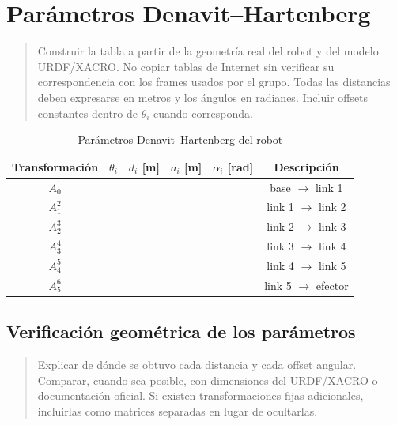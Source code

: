 \documentclass[journal]{IEEEtran}
\newcommand{\instr}[1]{%
\begin{quote}
\small
\noindent\textbf{\color{blue}{INSTRUCCIÓN:}} #1
\end{quote}
}
\newcommand{\pendiente}[1]{\textbf{\color{red}{[#1]}}}
\begin{document}
\section{Parámetros Denavit--Hartenberg}

\instr{Construir la tabla a partir de la geometría real del robot y del modelo URDF/XACRO. No copiar tablas de Internet sin verificar su correspondencia con los frames usados por el grupo. Todas las distancias deben expresarse en metros y los ángulos en radianes. Incluir offsets constantes dentro de $\theta_i$ cuando corresponda.}

\begin{table}[t]
\centering
\caption{Parámetros Denavit--Hartenberg del robot \pendiente{MODELO}}
\label{tab:dh}
\renewcommand{\arraystretch}{1.25}
\begin{tabular}{cccccc}
\toprule
\textbf{Transformación} &
\textbf{$\theta_i$} &
\textbf{$d_i$ [m]} &
\textbf{$a_i$ [m]} &
\textbf{$\alpha_i$ [rad]} &
\textbf{Descripción} \\
\midrule
$A_0^1$ & \pendiente{$q_1+\cdots$} & \pendiente{...} & \pendiente{...} & \pendiente{...} & base $\rightarrow$ link 1 \\
$A_1^2$ & \pendiente{$q_2+\cdots$} & \pendiente{...} & \pendiente{...} & \pendiente{...} & link 1 $\rightarrow$ link 2 \\
$A_2^3$ & \pendiente{$q_3+\cdots$} & \pendiente{...} & \pendiente{...} & \pendiente{...} & link 2 $\rightarrow$ link 3 \\
$A_3^4$ & \pendiente{$q_4+\cdots$} & \pendiente{...} & \pendiente{...} & \pendiente{...} & link 3 $\rightarrow$ link 4 \\
$A_4^5$ & \pendiente{$q_5+\cdots$} & \pendiente{...} & \pendiente{...} & \pendiente{...} & link 4 $\rightarrow$ link 5 \\
$A_5^6$ & \pendiente{$q_6+\cdots$} & \pendiente{...} & \pendiente{...} & \pendiente{...} & link 5 $\rightarrow$ efector \\
\bottomrule
\end{tabular}
\end{table}

\subsection{Verificación geométrica de los parámetros}

\instr{Explicar de dónde se obtuvo cada distancia y cada offset angular. Comparar, cuando sea posible, con dimensiones del URDF/XACRO o documentación oficial. Si existen transformaciones fijas adicionales, incluirlas como matrices separadas en lugar de ocultarlas.}
\end{document}
